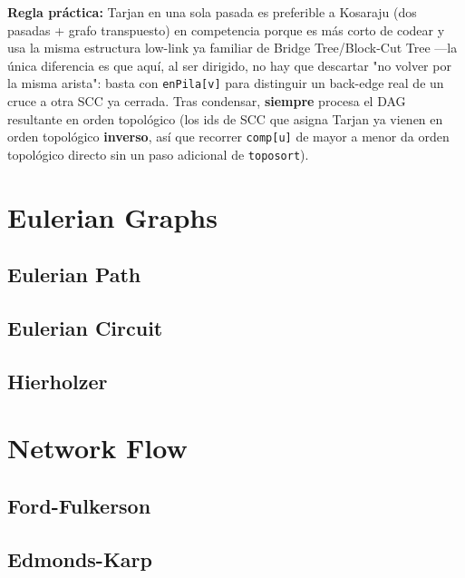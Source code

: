 \documentclass[10pt,a4paper,twocolumn]{article}
\begin{document}
\textbf{Regla práctica:} Tarjan en una sola pasada es preferible a
Kosaraju (dos pasadas + grafo transpuesto) en competencia porque es
más corto de codear y usa la misma estructura low-link ya familiar de
Bridge Tree/Block-Cut Tree —la única diferencia es que aquí, al ser
dirigido, no hay que descartar "no volver por la misma arista": basta
con \texttt{enPila[v]} para distinguir un back-edge real de un cruce a
otra SCC ya cerrada. Tras condensar, \textbf{siempre} procesa el DAG
resultante en orden topológico (los ids de SCC que asigna Tarjan ya
vienen en orden topológico \textbf{inverso}, así que recorrer
\texttt{comp[u]} de mayor a menor da orden topológico directo sin un
paso adicional de \texttt{toposort}).




\section{Eulerian Graphs}

\subsection{Eulerian Path}

\subsection{Eulerian Circuit}

\subsection{Hierholzer}



\section{Network Flow}

\subsection{Ford-Fulkerson}

\subsection{Edmonds-Karp}
\end{document}
